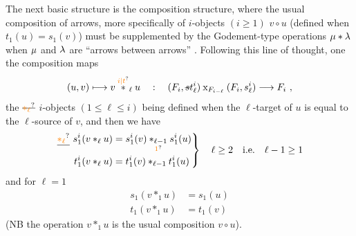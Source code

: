The next basic structure is the composition structure, where the usual composition of arrows, more specifically of $i$-objects $(i\geq1)$ $v\circ u$ (defined when $t_1(u)=s_1(v)$) must be supplemented by the Godement-type operations $\mu*\lambda$ when $\mu$ and $\lambda$ are ``arrows between arrows''  . Following this line of thought, one  the composition maps
\[
(u,v)\longmapsto v\overset{\unsure{i|t}}{*}_\ell u\quad:\quad (F_i,\deleted{s}t^i_\ell)\mathbin{\mathrm{x}}_{F_{i-\ell}}(F_i,s^i_\ell)\longrightarrow F_i\ ,
\]
the $\deleted{\unsure{*_\ell}}$  $i$-objects  $(1\leq\ell\leq i)$ being defined when the $\ell$-target of $u$ is equal to the $\ell$-source of $v$, and then we have
\[
\left.\begin{aligned}
\deleted{\unsure{*_\ell}}\ s^i_1(v*_\ell u)&=s^i_1(v)\underset{\unsure{1}}{*_{\ell-1}}s^i_1(u)\\
\handwritten{t^i_1(v*_\ell u)}&\handwritten{{}=t^i_1(v)*_{\ell-1}t^i_1(u)}
\end{aligned}\right\}\handwritten{\quad\ell\geq2\quad\text{i.e.}\quad\ell-1\geq1}
\]
and for $\ell=1$
\[
\begin{aligned}
s_1(v*_1u)&=s_1(u)\\
t_1(v*_1u)&=t_1(v)
\end{aligned}
\]
(NB the operation $v*_1u$ is the usual composition $v\circ u$).

